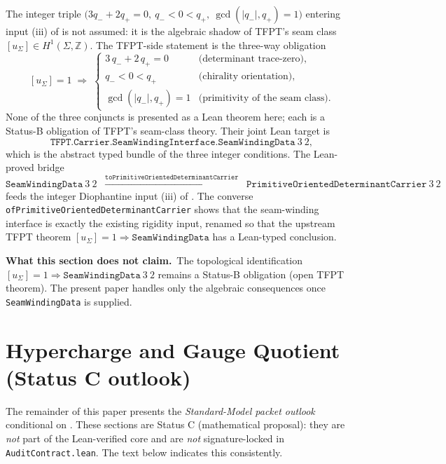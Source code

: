 \documentclass[11pt,a4paper]{article}
\begin{document}
The integer triple $\bigl(3q_-+2q_+=0,\ q_-<0<q_+,\ \gcd(|q_-|,q_+)=1\bigr)$ entering input
(iii) of  is not assumed: it is the algebraic shadow of TFPT's seam
class $[u_\Sigma]\in H^1(\Sigma,\mathbb Z)$. The TFPT-side statement is the three-way obligation
\[
[u_\Sigma]=1
\;\Longrightarrow\;
\begin{cases}
3\,q_-+2\,q_+ = 0 & \text{(determinant trace-zero)},\\
q_- < 0 < q_+ & \text{(chirality orientation)},\\
\gcd(|q_-|, q_+) = 1 & \text{(primitivity of the seam class)}.
\end{cases}
\]
None of the three conjuncts is presented as a Lean theorem here; each is a Status-B obligation
of TFPT's seam-class theory. Their joint Lean target is
\[
\texttt{TFPT.Carrier.SeamWindingInterface.SeamWindingData}\ 3\ 2,
\]
which is the abstract typed bundle of the three integer conditions. The Lean-proved bridge
\[
\texttt{SeamWindingData}\ 3\ 2
\;\;\xrightarrow{\texttt{toPrimitiveOrientedDeterminantCarrier}}\;\;
\texttt{PrimitiveOrientedDeterminantCarrier}\ 3\ 2
\]
feeds the integer Diophantine input (iii) of . The converse
\texttt{ofPrimitiveOrientedDeterminantCarrier} shows that the seam-winding interface is exactly
the existing rigidity input, renamed so that the upstream TFPT theorem
$[u_\Sigma]=1 \Rightarrow \texttt{SeamWindingData}$ has a Lean-typed conclusion.

\noindent
\textbf{What this section does not claim.}\ The topological identification
$[u_\Sigma]=1 \Rightarrow \texttt{SeamWindingData}\ 3\ 2$ remains a Status-B obligation
(open TFPT theorem). The present paper handles only the algebraic consequences once
\texttt{SeamWindingData} is supplied.

\section{Hypercharge and Gauge Quotient (Status C outlook)}
\label{sec:gauge-outlook}

\begin{tfptwarningbox}
The remainder of this paper presents the \emph{Standard-Model
packet outlook} conditional on . These
sections are Status C (mathematical proposal): they are
\emph{not} part of the Lean-verified core and are
\emph{not} signature-locked in \texttt{AuditContract.lean}.
The text below indicates this consistently.
\end{tfptwarningbox}
\end{document}
